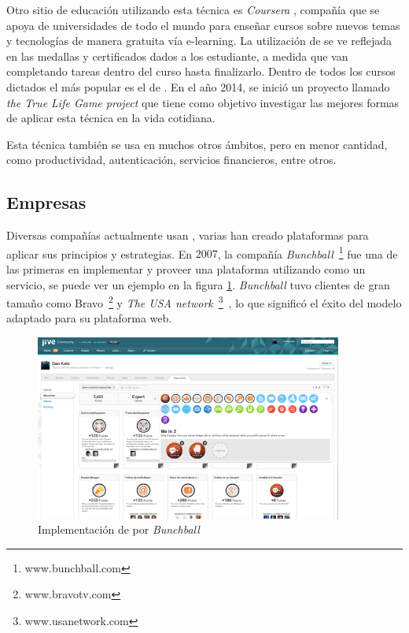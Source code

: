 Otro sitio de educación utilizando esta técnica es \emph{Coursera} \cite{Coursera},
compañía que se apoya de universidades de todo el mundo para enseñar
cursos sobre nuevos temas y tecnologías de manera gratuita vía e-learning.
La utilización de {\gam} se ve reflejada en las medallas y certificados dados
a los estudiante, a medida que van completando tareas dentro del curso
hasta finalizarlo.
Dentro de todos los cursos dictados el más popular es el de {\gam}\cite{Gam:Util:5}.
En el año 2014, se inició un proyecto llamado \emph{the True Life Game project}
que tiene como objetivo investigar las mejores formas de aplicar esta técnica en
la vida cotidiana.

Esta técnica también se usa en muchos otros ámbitos, pero en menor cantidad,
como productividad, autenticación, servicios financieros, entre otros.

\subsection{Empresas}

Diversas compañías actualmente usan {\gam}, varias han creado plataformas para
aplicar sus principios y estrategias.
En $2007$, la compañía \emph{Bunchball}~\footnote{www.bunchball.com} fue una de
las primeras en implementar y proveer una plataforma utilizando {\gam} como un
servicio\cite{Gam:Bunchball:1}, se puede ver un ejemplo en la figura \ref{fig:bunch}.
\emph{Bunchball} tuvo clientes de gran tamaño como Bravo~\footnote{www.bravotv.com}
y \emph{The USA network}~\footnote{www.usanetwork.com}~\cite{Gam:Bunchball:2},
lo que significó el éxito del modelo adaptado para su plataforma web.

\begin{figure}[!htb]
  \centering
  \includegraphics[width=0.9\textwidth]{images/Gam_bunch.png}
  \caption[Implementación \emph{Bunchball}]{Implementación de {\gam} por \emph{Bunchball}}
  \label{fig:bunch}
\end{figure}


